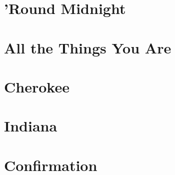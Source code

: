 \documentclass[twoside]{book}
\begin{document}
\chapter{'Round Midnight}


\chapter{All the Things You Are}


\chapter{Cherokee}


\chapter{Indiana}


\chapter{Confirmation}


\begingroup
\renewcommand*{\glossarysection}[2][]{}%
\printglossary[style=bookdefinition]
\endgroup

\printbibliography[heading=bookbibliography, title={Bibliography}]
\end{document}
